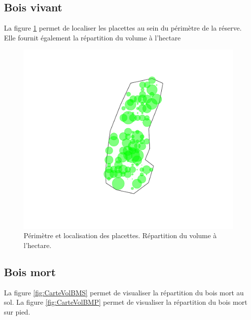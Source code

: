 \documentclass[a4paper]{book}\usepackage[]{graphicx}\usepackage[]{color}
\makeatletter
\def\maxwidth{ %
  \ifdim\Gin@nat@width>\linewidth
    \linewidth
  \else
    \Gin@nat@width
  \fi
}
\newenvironment{knitrout}{}{} %
\makeatother
\begin{document}
\subsection{Bois vivant}
La figure \ref{fig:CartePlacettes} permet de localiser les placettes au sein du périmètre de la réserve. Elle fournit également la répartition du volume à l'hectare
\begin{knitrout}
\color{fgcolor}\begin{figure}[h]


{\centering \includegraphics[width=\maxwidth]{Figures/CartePlacettes-1} 

}

\caption[Périmètre et localisation des placettes]{Périmètre et localisation des placettes. Répartition du volume à l'hectare.\label{fig:CartePlacettes}}
\end{figure}


\end{knitrout}


\subsection{Bois mort}
La figure \ref{fig:CarteVolBMS} permet de visualiser la répartition du bois mort au sol. La figure \ref{fig:CarteVolBMP} permet de visualiser la répartition du bois mort sur pied.
\end{document}
